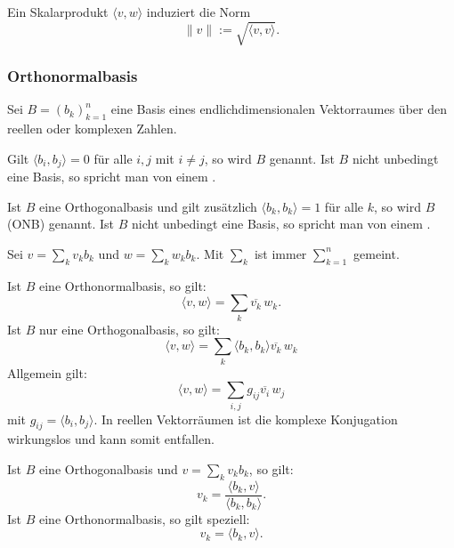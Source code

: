 Ein Skalarprodukt $\langle v,w\rangle$ induziert die Norm
\begin{equation}
\|v\| := \sqrt{\langle v,v\rangle}.
\end{equation}

\subsubsection{Orthonormalbasis}\label{sec:ONB}
Sei $B=(b_k)_{k=1}^n$ eine Basis eines endlichdimensionalen
Vektorraumes über den reellen oder komplexen Zahlen.

\begin{definition}[Orthogonalbasis]
Gilt $\langle b_i,b_j\rangle=0$
für alle $i,j$ mit $i\ne j$, so wird $B$ 
genannt. Ist $B$ nicht unbedingt eine Basis, so spricht man von einem 
.
\end{definition}

\begin{definition}[Orthonormalbasis]
Ist $B$ eine Orthogonalbasis und gilt
zusätzlich $\langle b_k,b_k\rangle=1$ für alle $k$, so wird
$B$  (ONB) genannt. Ist $B$ nicht unbedingt
eine Basis,  so spricht man von einem .
\end{definition}

Sei $v=\sum_k v_kb_k$ und $w=\sum_k w_kb_k$.
Mit $\sum_k$ ist immer $\sum_{k=1}^n$ gemeint.

Ist $B$ eine Orthonormalbasis, so gilt:
\begin{equation}
\langle v,w\rangle = \sum_k \overline{v_k}\,w_k.
\end{equation}
Ist $B$ nur eine Orthogonalbasis, so gilt:
\begin{equation}
\langle v,w\rangle = \sum_k \langle b_k,b_k\rangle \overline{v_k}\,w_k
\end{equation}
Allgemein gilt:
\begin{equation}
\langle v,w\rangle = \sum_{i,j} g_{ij} \overline{v_i}\,w_j
\end{equation}
mit $g_{ij}=\langle b_i,b_j\rangle$. In reellen Vektorräumen
ist die komplexe Konjugation wirkungslos und kann somit entfallen.

Ist $B$ eine Orthogonalbasis und $v=\sum_k v_k b_k$, so gilt:
\begin{equation}
v_k = \frac{\langle b_k,v\rangle}{\langle b_k,b_k\rangle}.
\end{equation}
Ist $B$ eine Orthonormalbasis, so gilt speziell:
\begin{equation}
v_k = \langle b_k,v\rangle.
\end{equation}


